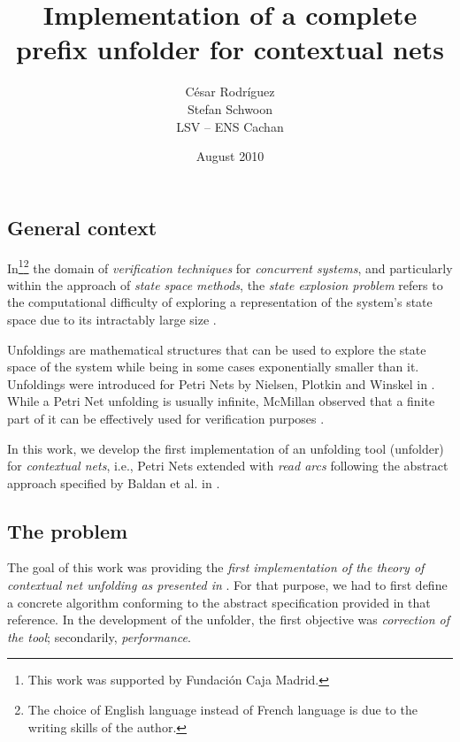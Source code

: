 \documentclass[11pt,a4paper]{article}
\begin{document}

\title{Implementation of a complete prefix unfolder for contextual nets}

\author{César Rodríguez\\Stefan Schwoon\\LSV -- ENS Cachan}
\date{August 2010}

\maketitle
\thispagestyle{empty}


\subsection*{General context}

In\footnote{This work was supported by Fundación Caja Madrid.}\footnote{The
choice of English language instead of French language is due to the writing
skills of the author.} the domain of \emph{verification techniques} for
\emph{concurrent systems}, and particularly within the approach of \emph{state
space methods}, the \emph{state explosion problem} refers to the computational
difficulty of exploring a representation of the system's state space due to its
intractably large size .

Unfoldings are mathematical structures that can be used to explore the state
space of the system while being in some cases exponentially smaller than it.
Unfoldings were introduced for Petri Nets by Nielsen, Plotkin and Winskel in
.  While a Petri Net unfolding is usually infinite, McMillan
observed that a finite part of it can be effectively used for verification
purposes .

In this work, we develop the first implementation of an unfolding tool
(unfolder) for \emph{contextual nets}, i.e., Petri Nets extended with
\emph{read arcs} following the abstract approach specified by Baldan et al. in
.

\subsection*{The problem}

The goal of this work was providing the \emph{first implementation of the
theory of contextual net unfolding as presented in }.  For that
purpose, we had to first define a concrete algorithm conforming to the abstract
specification provided in that reference.  In the development of the unfolder,
the first objective was \emph{correction of the tool}; secondarily,
\emph{performance}.
\end{document}
